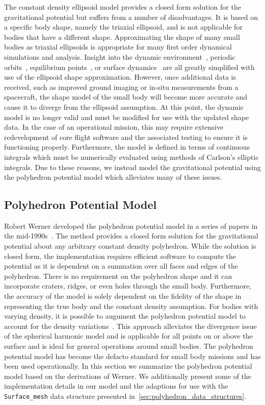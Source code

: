 The constant density ellipsoid model provides a closed form solution for the gravitational potential but suffers from a number of disadvantages.
It is based on a specific body shape, namely the triaxial ellipsoid, and is not applicable for bodies that have a different shape.
Approximating the shape of many small bodies as triaxial ellipsoids is appropriate for many first order dynamical simulations and analysis.
Insight into the dynamic environment~\cite{guelman2014}, periodic orbits~\cite{hu2002}, equilibrium points~\cite{scheeres1994}, or surface dynamics~\cite{furfaro2013} are all greatly simplified with use of the ellipsoid shape approximation.
However, once additional data is received, such as improved ground imaging or in-situ measurements from a spacecraft, the shape model of the small body will become more accurate and cause it to diverge from the ellipsoid assumption.
At this point, the dynamic model is no longer valid and must be modified for use with the updated shape data.
In the case of an operational mission, this may require extensive redevelopment of core flight software and the associated testing to ensure it is functioning properly. 
Furthermore, the model is defined in terms of continuous integrals which must be numerically evaluated using methods of Carlson's elliptic integrals.
Due to these reasons, we instead model the gravitational potential using the polyhedron potential model which alleviates many of these issues.

\subsection{Polyhedron Potential Model}\label{sec:polyhedron_potential}

Robert Werner developed the polyhedron potential model in a series of papers in the mid-1990s~\cite{werner1994,werner1996,werner1997}.
The method provides a closed form solution for the gravitational potential about any arbitrary constant density polyhedron.
While the solution is closed form, the implementation requires efficient software to compute the potential as it is dependent on a summation over all faces and edges of the polyhedron.
There is no requirement on the polyhedron shape and it can incorporate craters, ridges, or even holes through the small body.
Furthermore, the accuracy of the model is solely dependent on the fidelity of the shape in representing the true body and the constant density assumption.
For bodies with varying density, it is possible to augument the polyhedron potential model to account for the density variations~\cite{scheeres2000a}.
This approach alleviates the divergence issue of the spherical harmonic model and is applicable for all points on or above the surface and is ideal for general operations around small bodies.
The polyhedron potential model has become the defacto standard for small body missions and has been used operationally.
In this section we summarize the polyhedron potential model based on the derivations of Werner.
We additionally present some of the implementation details in our model and the adaptions for use with the \texttt{Surface\_mesh} data structure presented  in~\cref{sec:polyhedron_data_structures}.

